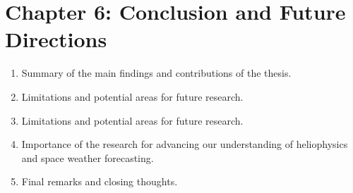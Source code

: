 \documentclass{article}
\begin{document}
\section{Chapter 6: Conclusion and Future Directions}
\begin{enumerate}
    \item Summary of the main findings and contributions of the thesis.
    \item Limitations and potential areas for future research.
    \item Limitations and potential areas for future research.
    \item Importance of the research for advancing our understanding of heliophysics and space weather forecasting.
    \item Final remarks and closing thoughts.
\end{enumerate}




\end{document}
